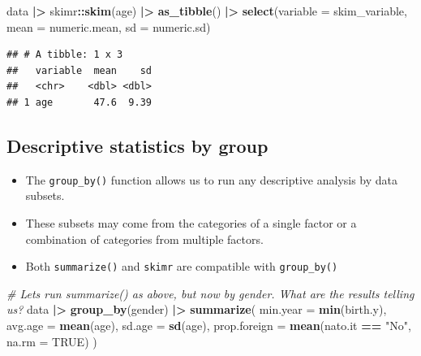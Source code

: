 \documentclass[
]{book}
\newenvironment{Shaded}{\begin{snugshade}}{\end{snugshade}}
\newcommand{\AttributeTok}[1]{\textcolor[rgb]{0.13,0.29,0.53}{#1}}
\newcommand{\CommentTok}[1]{\textcolor[rgb]{0.56,0.35,0.01}{\textit{#1}}}
\newcommand{\ConstantTok}[1]{\textcolor[rgb]{0.56,0.35,0.01}{#1}}
\newcommand{\FunctionTok}[1]{\textcolor[rgb]{0.13,0.29,0.53}{\textbf{#1}}}
\newcommand{\NormalTok}[1]{#1}
\newcommand{\SpecialCharTok}[1]{\textcolor[rgb]{0.81,0.36,0.00}{\textbf{#1}}}
\newcommand{\StringTok}[1]{\textcolor[rgb]{0.31,0.60,0.02}{#1}}
\providecommand{\tightlist}{%
  \setlength{\itemsep}{0pt}\setlength{\parskip}{0pt}}
\begin{document}
\begin{Shaded}
\begin{Highlighting}[]
\NormalTok{data }\SpecialCharTok{|\textgreater{}} 
\NormalTok{  skimr}\SpecialCharTok{::}\FunctionTok{skim}\NormalTok{(age) }\SpecialCharTok{|\textgreater{}} 
  \FunctionTok{as\_tibble}\NormalTok{() }\SpecialCharTok{|\textgreater{}} 
  \FunctionTok{select}\NormalTok{(}\AttributeTok{variable =}\NormalTok{ skim\_variable, }\AttributeTok{mean =}\NormalTok{ numeric.mean, }\AttributeTok{sd =}\NormalTok{ numeric.sd)}
\end{Highlighting}
\end{Shaded}

\begin{verbatim}
## # A tibble: 1 x 3
##   variable  mean    sd
##   <chr>    <dbl> <dbl>
## 1 age       47.6  9.39
\end{verbatim}

\hypertarget{descriptive-statistics-by-group}{%
\subsection{Descriptive statistics by group}\label{descriptive-statistics-by-group}}

\begin{itemize}
\tightlist
\item
  The \texttt{group\_by()} function allows us to run any descriptive analysis by data subsets.
\item
  These subsets may come from the categories of a single factor or a combination of categories from multiple factors.
\item
  Both \texttt{summarize()} and \texttt{skimr} are compatible with \texttt{group\_by()}
\end{itemize}

\begin{Shaded}
\begin{Highlighting}[]
\CommentTok{\# Let\textquotesingle{}s run summarize() as above, but now by gender. What are the results telling us?}
\NormalTok{data }\SpecialCharTok{|\textgreater{}} 
  \FunctionTok{group\_by}\NormalTok{(gender) }\SpecialCharTok{|\textgreater{}} 
  \FunctionTok{summarize}\NormalTok{(}
    \AttributeTok{min.year =} \FunctionTok{min}\NormalTok{(birth.y),}
    \AttributeTok{avg.age =} \FunctionTok{mean}\NormalTok{(age),}
    \AttributeTok{sd.age =} \FunctionTok{sd}\NormalTok{(age),}
    \AttributeTok{prop.foreign =} \FunctionTok{mean}\NormalTok{(nato.it }\SpecialCharTok{==} \StringTok{"No"}\NormalTok{, }\AttributeTok{na.rm =} \ConstantTok{TRUE}\NormalTok{)}
\NormalTok{  )}
\end{Highlighting}
\end{Shaded}
\end{document}
